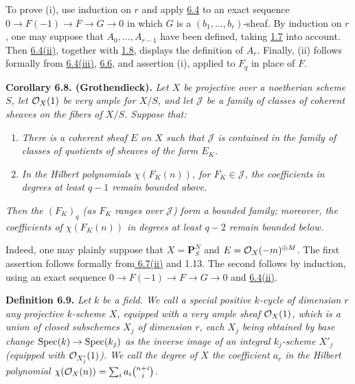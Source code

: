 To prove (i), use induction on $r$ and apply \hyperlink{sga6.e13.thm.6-4}{6.4} to an exact sequence
$0\longrightarrow F(-1)\longrightarrow F\longrightarrow G\longrightarrow0$
in which $G$ is a $(b_1,\ldots,b_r)$-sheaf. By induction on $r$, one may
suppose that $A_0,\ldots,A_{r-1}$ have been defined, taking \hyperlink{sga6.e13.lem.1-7}{1.7} into
account. Then \hyperlink{sga6.e13.thm.6-4}{6.4(ii)}, together with \hyperlink{sga6.e13.prop.1-8}{1.8}, displays the definition of
$A_r$. Finally, (ii) follows formally from \hyperlink{sga6.e13.thm.6-4}{6.4(iii)}, \hyperlink{sga6.e13.prop.6-6}{6.6}, and assertion
(i), applied to $F_q$ in place of $F$.

\textbf{Corollary 6.8. (Grothendieck).} \emph{Let $X$ be projective over
a noetherian scheme $S$, let $\mathcal O_X(1)$ be very ample for $X/S$, and let
$\mathcal J$ be a family of classes of coherent sheaves on the fibers of
$X/S$. Suppose that:}
\begin{enumerate}[label=(\alph*)]
\item \emph{There is a coherent sheaf $E$ on $X$ such that $\mathcal J$
is contained in the family of classes of quotients of sheaves of the
form $E_K$.}
\item[$(b_q)$] \emph{In the Hilbert polynomials $\chi(F_K(n))$, for
$F_K\in\mathcal J$, the coefficients in degrees at least $q-1$ remain
bounded above.}
\end{enumerate}
\emph{Then the $(F_K)_q$ (as $F_K$ ranges over $\mathcal J$) form a
bounded family; moreover, the coefficients of $\chi(F_K(n))$ in degrees
at least $q-2$ remain bounded below.}

Indeed, one may plainly suppose that $X=\mathbf P^N_S$ and
$E=\mathcal O_X(-m)^{\oplus M}$. The first assertion follows formally from\hyperlink{sga6.e13.thm.6-7}{
6.7(ii)} and 1.13. The second follows by induction, using an exact sequence
$0\longrightarrow F(-1)\longrightarrow F\longrightarrow G\longrightarrow0$
and \hyperlink{sga6.e13.thm.6-4}{6.4(ii)}.

\textbf{Definition 6.9.} \emph{Let $k$ be a field. We call a
\emph{special positive $k$-cycle of dimension $r$} any projective
$k$-scheme $X$, equipped with a very ample sheaf $\mathcal O_X(1)$, which is a
union of closed subschemes $X_j$ of dimension $r$, each $X_j$ being
obtained by base change $\operatorname{Spec}(k)\to\operatorname{Spec}(k_j)$ as the inverse image of
an integral $k_j$-scheme $X'_j$ (equipped with $\mathcal O_{X'_j}(1)$). We call
the \emph{degree} of $X$ the coefficient $a_r$ in the Hilbert polynomial
$\chi(\mathcal O_X(n))=\sum_i a_i\binom{n+i}{i}$.}

